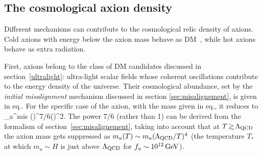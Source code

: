\subsection{The cosmological axion density}
\label{AxionCosmo}
Different mechanisms can contribute to the cosmological relic density of axions.
Cold axions with energy below the axion mass behave as DM~\cite{axionDM},
while hot axions behave as extra radiation.

\smallskip

First, axions belong to the class of DM candidates discussed in section~\ref{ultralight}:
ultra-light scalar fields whose coherent oscillations contribute to the  energy density of the universe.
Their cosmological abundance, set by the {\em initial misalignment} mechanism discussed in section \ref{sec:misalignement}, is given in eq.. For the specific
case of the axion, with the mass given in eq., it reduces to
\beq
 \label{eq:Omegaaxion}
\Omega_a^{\rm mis}   \left(\right)^{7/6}\left(\right)^2.
\eeq
The power $7/6$ (rather than 1) can be derived from the formalism of section~\ref{sec:misalignement},
taking into account that at $T\circa{>}\Lambda_{\rm QCD}$ the 
axion mass gets suppressed as $m_a(T) \sim m_a (\Lambda_{\rm QCD}/T)^4$
(the temperature $T_*$ at which $m_a \sim H$ is just above $\Lambda_{\rm QCD}$ for $f_a\sim 10^{12}\,{\rm GeV}$).

